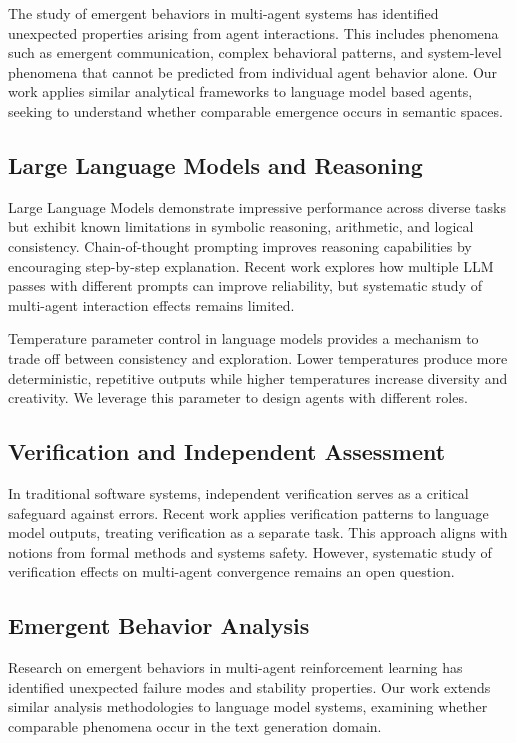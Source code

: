\documentclass[conference]{IEEEtran}
\begin{document}
The study of emergent behaviors in multi-agent systems has identified unexpected properties arising from agent interactions. This includes phenomena such as emergent communication, complex behavioral patterns, and system-level phenomena that cannot be predicted from individual agent behavior alone. Our work applies similar analytical frameworks to language model based agents, seeking to understand whether comparable emergence occurs in semantic spaces.

\subsection{Large Language Models and Reasoning}

Large Language Models demonstrate impressive performance across diverse tasks but exhibit known limitations in symbolic reasoning, arithmetic, and logical consistency. Chain-of-thought prompting improves reasoning capabilities by encouraging step-by-step explanation. Recent work explores how multiple LLM passes with different prompts can improve reliability, but systematic study of multi-agent interaction effects remains limited.

Temperature parameter control in language models provides a mechanism to trade off between consistency and exploration. Lower temperatures produce more deterministic, repetitive outputs while higher temperatures increase diversity and creativity. We leverage this parameter to design agents with different roles.

\subsection{Verification and Independent Assessment}

In traditional software systems, independent verification serves as a critical safeguard against errors. Recent work applies verification patterns to language model outputs, treating verification as a separate task. This approach aligns with notions from formal methods and systems safety. However, systematic study of verification effects on multi-agent convergence remains an open question.

\subsection{Emergent Behavior Analysis}

Research on emergent behaviors in multi-agent reinforcement learning has identified unexpected failure modes and stability properties. Our work extends similar analysis methodologies to language model systems, examining whether comparable phenomena occur in the text generation domain.
\end{document}
